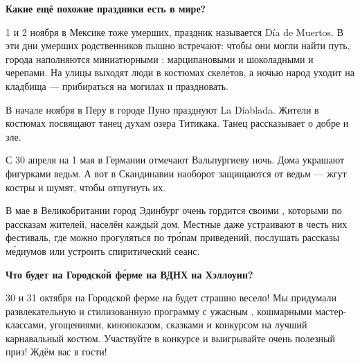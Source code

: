\textbf{Какие ещё похожие праздники есть в мире?}

1 и 2 ноября в Мексике тоже  умерших, праздник называется Día de Muertos. В эти дни умерших родственников пышно встречают: чтобы они могли найти путь, города наполняются миниатюрными : марципановыми и шоколадными  и черепами. На улицы выходят люди в костюмах скел\'{е}тов, а ночью народ уходит на кладбища --- прибираться на могилах и праздновать.

В начале ноября в Перу в городе Пуно празднуют La Diablada. Жители в  костюмах посвящают танец духам озера Титикака. Танец рассказывает о добре и зле.

С 30 апреля на 1 мая в Германии отмечают Вальпургиеву ночь. Дома украшают фигурками ведьм. А вот в Скандинавии наоборот защищаются от ведьм — жгут костры и шумят, чтобы отпугнуть их.

В мае в Великобритании город Эдинбург очень гордится своими , которыми по рассказам жителей, населён каждый дом. Местные даже устраивают в честь них фестиваль, где можно прогуляться по тр\'{о}пам приведений, послушать рассказы м\'{е}диумов или устроить спиритический сеанс.

\textbf{Что будет на Городск\'{о}й ф\'{е}рме на ВДНХ на Хэллоуин?}

30 и 31 октября на Городской ферме на  будет страшно весело! Мы придумали развлекательную и стилизованную программу с ужасным , кошмарными мастер-классами,  угощениями, кинопоказом, сказками и конкурсом на лучший карнавальный костюм. Участвуйте в конкурсе и выигрывайте очень полезный приз! Ждём вас в гости!